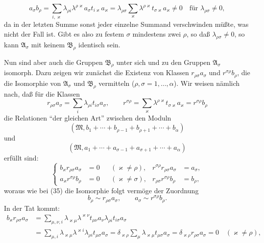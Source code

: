 \documentclass[11pt]{article}
\begin{document}
\[
 a_\sigma b_\rho=
 \sum_{i,\varkappa}\lambda_{\rho i}\lambda^{\rho\varkappa}a_\sigma t_{i\varkappa}a_\varkappa
 =\lambda_{\rho\sigma}
 \sum_{\varkappa}\lambda^{\rho\varkappa}t_{\sigma\varkappa}a_\varkappa\ne0
 \quad\text{für }\lambda_{\rho\sigma}\ne0,
\]
da in der letzten Summe sonst jeder einzelne Summand verschwinden müßte, was nicht der Fall ist. Gibt es also zu festem $\sigma$ mindestens zwei $\rho$, so daß $\lambda_{\rho\sigma}\ne0$, so kann $\mathfrak A_\sigma$ mit keinem $\mathfrak B_\rho$ identisch sein.

Nun sind aber auch die Gruppen $\mathfrak B_\rho$ unter sich und zu den Gruppen $\mathfrak A_\sigma$ isomorph. Dazu zeigen wir zunächst die Existenz von Klassen $r_{\rho\sigma}a_\sigma$ und $r^{\sigma\rho}b_\rho$, die die Isomorphie von $\mathfrak A_\sigma$ und $\mathfrak B_\rho$ vermitteln ($\rho,\sigma=1,
\ldots,\alpha$). Wir weisen nämlich nach, daß für die Klassen
\[
 r_{\rho\sigma}a_\sigma=\sum_i\lambda_{\rho i}t_{i\sigma}a_\sigma,
 \qquad
 r^{\sigma\rho}=\sum_\varkappa\lambda^{\rho\varkappa}t_{\sigma\varkappa}a_\varkappa
 =r^{\sigma\rho}b_\rho
\]
die Relationen ``der gleichen Art'' zwischen den Moduln
\[
 (\mathfrak M,b_1+\cdots+b_{\rho-1}+b_{\rho+1}+\cdots+b_\alpha)
\]
und
\[
 (\mathfrak M,a_1+\cdots+a_{\sigma-1}+a_{\sigma+1}+\cdots+a_\alpha)
\]
erfüllt sind:
\begin{equation}
\left\{
\begin{aligned}
 b_\varkappa r_{\rho\sigma}a_\sigma&=0 &&(\varkappa\ne\rho),&
 r^{\sigma\rho}r_{\rho\sigma}a_\sigma&=a_\sigma,\\
 a_\varkappa r^{\sigma\rho}b_\rho&=0 &&(\varkappa\ne\sigma),&
 r_{\rho\sigma}r^{\sigma\rho}b_\rho&=b_\rho,
\end{aligned}\right.
\tag{39}
\end{equation}
woraus wie bei (35) die Isomorphie folgt vermöge der Zuordnung
\begin{equation}
 b_\rho\sim r_{\rho\sigma}a_\sigma,
 \qquad
 a_\sigma\sim r^{\sigma\rho}b_\rho.
\tag{40}
\end{equation}
In der Tat kommt:
\[
\begin{aligned}
 b_\varkappa r_{\rho\sigma}a_\sigma
 &=\sum_{\mu,\nu,i}\lambda_{\varkappa\mu}\lambda^{\varkappa\nu}t_{\mu\nu}a_\nu\lambda_{\rho i}t_{i\sigma}a_\sigma\\
 &=\sum_{\mu,i}\lambda_{\varkappa\mu}\lambda^{\varkappa i}\lambda_{\rho i}t_{\mu\sigma}a_\sigma
 =\delta_{\varkappa\rho}\sum_\mu\lambda_{\varkappa\mu}t_{\mu\sigma}a_\sigma
 =\delta_{\varkappa\rho}r_{\rho\sigma}a_\sigma=0\quad(\varkappa\ne\rho),
\end{aligned}
\]
\end{document}
